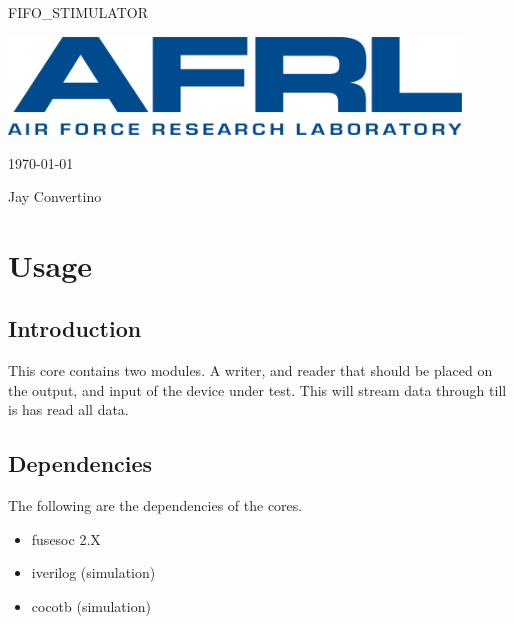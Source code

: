 \begin{titlepage}
  \begin{center}

  {\Huge FIFO\_STIMULATOR}

  \vspace{25mm}

  \includegraphics[width=0.90\textwidth,height=\textheight,keepaspectratio]{img/AFRL.png}

  \vspace{25mm}

  \today

  \vspace{15mm}

  {\Large Jay Convertino}

  \end{center}
\end{titlepage}

\tableofcontents

\newpage

\section{Usage}

\subsection{Introduction}

\par
This core contains two modules. A writer, and reader that should be placed on the
output, and input of the device under test. This will stream data through till
is has read all data.

\subsection{Dependencies}

\par
The following are the dependencies of the cores.

\begin{itemize}
  \item fusesoc 2.X
  \item iverilog (simulation)
  \item cocotb (simulation)
\end{itemize}

